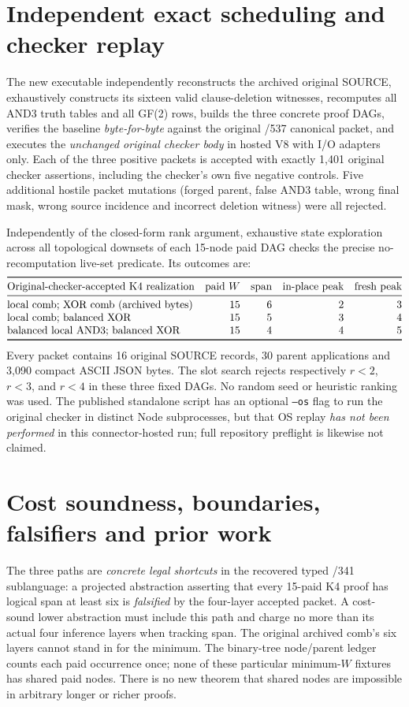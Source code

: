 \documentclass[11pt]{article}
\begin{document}
\section*{Independent exact scheduling and checker replay}
The new executable  independently reconstructs the archived original SOURCE, exhaustively constructs its sixteen valid clause-deletion witnesses, recomputes all AND3 truth tables and all GF(2) rows, builds the three concrete proof DAGs, verifies the baseline \emph{byte-for-byte} against the original /537 canonical packet, and executes the \emph{unchanged original checker body} in hosted V8 with I/O adapters only. Each of the three positive packets is accepted with exactly 1,401 original checker assertions, including the checker's own five negative controls. Five additional hostile packet mutations (forged parent, false AND3 table, wrong final mask, wrong source incidence and incorrect deletion witness) were all rejected.

Independently of the closed-form rank argument, exhaustive state exploration across all topological downsets of each 15-node paid DAG checks the precise no-recomputation live-set predicate. Its outcomes are:
\[
\begin{array}{@{}lrrrr@{}}
\toprule
\text{Original-checker-accepted K4 realization}
& \text{paid }W&\text{span}&\text{in-place peak}&\text{fresh peak}\\
\midrule
\text{local comb; XOR comb (archived bytes)}&15&6&2&3\\
\text{local comb; balanced XOR}&15&5&3&4\\
\text{balanced local AND3; balanced XOR}&15&4&4&5\\
\bottomrule
\end{array}
\]
Every packet contains 16 original SOURCE records, 30 parent applications and 3,090 compact ASCII JSON bytes. The slot search rejects respectively $r<2$, $r<3$, and $r<4$ in these three fixed DAGs. No random seed or heuristic ranking was used. The published standalone script has an optional \texttt{--os} flag to run the original checker in distinct Node subprocesses, but that OS replay \emph{has not been performed} in this connector-hosted run; full repository preflight is likewise not claimed.

\section*{Cost soundness, boundaries, falsifiers and prior work}
\noindent The three paths are \emph{concrete legal shortcuts} in the recovered typed /341 sublanguage: a projected abstraction asserting that every 15-paid K4 proof has logical span at least six is \emph{falsified} by the four-layer accepted packet. A cost-sound lower abstraction must include this path and charge no more than its actual four inference layers when tracking span. The original archived comb's six layers cannot stand in for the minimum. The binary-tree node/parent ledger counts each paid occurrence once; none of these particular minimum-$W$ fixtures has shared paid nodes. There is no new theorem that shared nodes are impossible in arbitrary longer or richer proofs.
\end{document}
